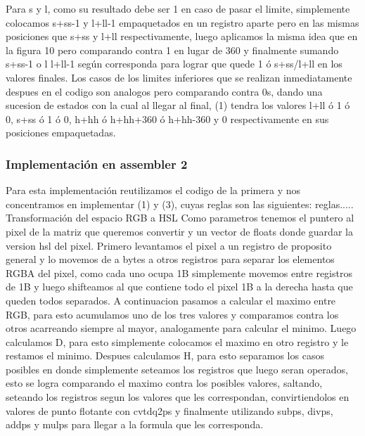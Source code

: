 \documentclass[a4paper]{article}
\begin{document}
Para s y l, como su resultado debe ser 1 en caso de pasar el limite, simplemente colocamos s+ss-1 y l+ll-1 empaquetados en un registro aparte pero en las mismas posiciones que s+ss y l+ll respectivamente, luego aplicamos la misma idea que en la figura 10 pero comparando contra 1 en lugar de 360 y finalmente sumando s+ss-1 o l l+ll-1 según corresponda para lograr que quede 1 ó s+ss/l+ll en los valores finales. Los casos de los limites inferiores que se realizan inmediatamente despues en el codigo son analogos pero comparando contra 0s, dando una sucesion de estados con la cual al llegar al final, (1) tendra los valores l+ll ó 1 ó 0, s+ss ó 1 ó 0,  h+hh ó h+hh+360 ó h+hh-360 y 0 respectivamente en sus posiciones empaquetadas.

\subsubsection{Implementación en assembler 2}
Para esta implementación reutilizamos el codigo de la primera y nos concentramos en implementar (1) y (3), cuyas reglas son las siguientes:
\newline\newline
reglas.....
\newline\newline
Transformación del espacio RGB a HSL
\newline\newline
Como parametros tenemos el puntero al pixel de la matriz que queremos convertir y un vector de floats donde guardar la version hsl del pixel.
Primero levantamos el pixel a un registro de proposito general y lo movemos de a bytes a otros registros para separar los elementos RGBA del pixel, como cada uno ocupa 1B  simplemente movemos entre registros de 1B y luego shifteamos al que contiene todo el pixel 1B a la derecha hasta que queden todos separados.
\newline
A continuacion pasamos a calcular el maximo entre RGB, para esto acumulamos uno de los tres valores y comparamos contra los otros acarreando siempre al mayor, analogamente para calcular el minimo.
\newline
Luego calculamos D, para esto simplemente colocamos el maximo en otro registro y le restamos el minimo.
\newline
Despues calculamos H, para esto separamos los casos posibles en donde simplemente seteamos los registros que luego seran operados, esto se logra comparando el maximo contra los posibles valores, saltando, seteando los registros segun los valores que les correspondan, convirtiendolos en valores de punto flotante con cvtdq2ps y finalmente utilizando subps, divps, addps y mulps para llegar a la formula que les corresponda.
\newline
\end{document}
